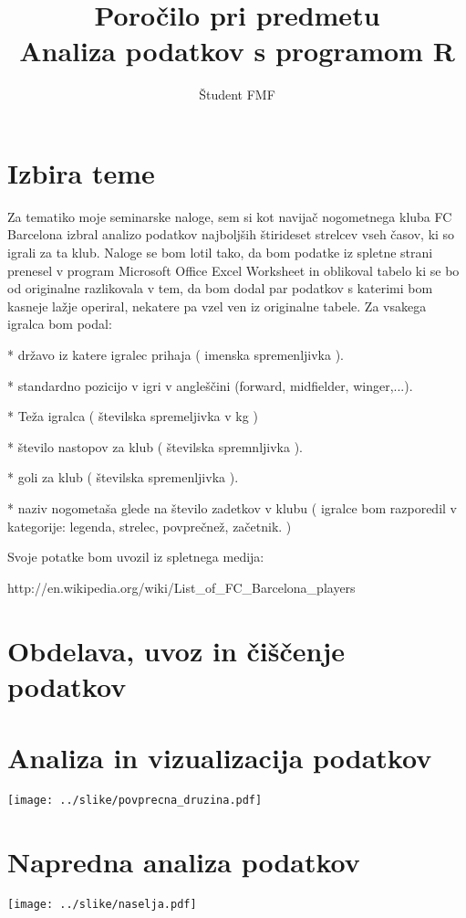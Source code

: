 \documentclass[11pt,a4paper]{article}
\begin{document}
\title{Poročilo pri predmetu \\
Analiza podatkov s programom R}
\author{Študent FMF}
\maketitle

\section{Izbira teme}

Za tematiko moje seminarske naloge, sem si kot navijač nogometnega kluba FC Barcelona izbral analizo podatkov najboljših štirideset strelcev vseh časov, ki so igrali za ta klub. Naloge se bom lotil tako, da bom podatke iz spletne strani prenesel v program Microsoft Office Excel Worksheet in oblikoval tabelo ki se bo od originalne razlikovala v tem, da bom dodal par podatkov s katerimi bom kasneje lažje operiral, nekatere pa vzel ven iz originalne tabele. Za vsakega igralca bom podal:

* državo iz katere igralec prihaja ( imenska spremenljivka ).

* standardno pozicijo v igri v angleščini (forward, midfielder, winger,...).

* Teža igralca ( številska spremeljivka v kg )

* število nastopov za klub ( številska spremnljivka ).

* goli za klub ( številska spremenljivka ).

* naziv nogometaša glede na število zadetkov v klubu ( igralce bom razporedil v kategorije: legenda, strelec, povprečnež, začetnik. )

Svoje potatke bom uvozil iz spletnega medija: 

http://en.wikipedia.org/wiki/List_of_FC_Barcelona_players


\section{Obdelava, uvoz in čiščenje podatkov}

\section{Analiza in vizualizacija podatkov}

\texttt{[image: ../slike/povprecna\_druzina.pdf]}

\section{Napredna analiza podatkov}

\texttt{[image: ../slike/naselja.pdf]}
\end{document}
